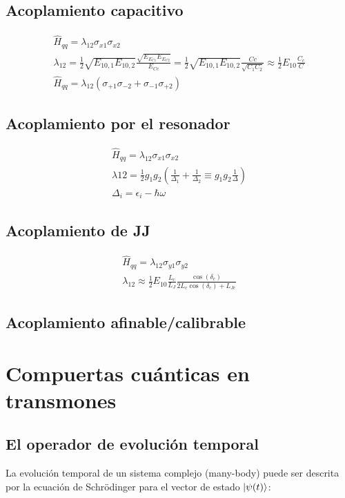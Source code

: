 \subsection{Acoplamiento capacitivo}
\begin{align*}
\hat{H}_{qq} = \lambda_{1 2} \sigma_{x1} \sigma_{x2} \\
\lambda_{1 2} = \frac{1}{2} \sqrt{E_{1 0, 1} E_{1 0, 2}} \frac{\sqrt{E_{E_{C1}} E_{E_{C2}}}}{E_{Cc}} = \frac{1}{2} \sqrt{E_{1 0, 1} E_{1 0, 2}} \frac{Cc}{\sqrt{C_1 C_2}} \approx \frac{1}{2} E_{1 0} \frac{C_c}{C} \\
\hat{H}_{qq} = \lambda_{1 2} (\sigma_{+1} \sigma_{-2}  + \sigma_{-1} \sigma_{+2})
\end{align*}

\subsection{Acoplamiento por el resonador}
\begin{align*}
\hat{H}_{qq} = \lambda_{1 2} \sigma_{x1} \sigma_{x2} \\
\lambda{1 2} = \frac{1}{2} g_1 g_2 (\frac{1}{\Delta_1} + \frac{1}{\Delta_2} \equiv g_1 g_2 \frac{1}{\Delta}) \\
\Delta_i = \epsilon_i - \hbar \omega
\end{align*}

\subsection{Acoplamiento de JJ}
\begin{align*}
\hat{H}_{qq} = \lambda_{1 2} \sigma_{y1} \sigma_{y2} \\
\lambda_{1 2} \approx \frac{1}{2} E_{1 0} \frac{L_c}{L_J} \frac{\cos(\delta_c)}{2L_c \cos(\delta_c) + L_{J c}}
\end{align*}

\subsection{Acoplamiento afinable/calibrable}

\section{Compuertas cuánticas en transmones}

\subsection{El operador de evolución temporal}
La evolución temporal de un sistema complejo (many-body) puede ser descrita por la ecuación de Schrödinger para el vector de estado $\ket{\psi(t)}$:

